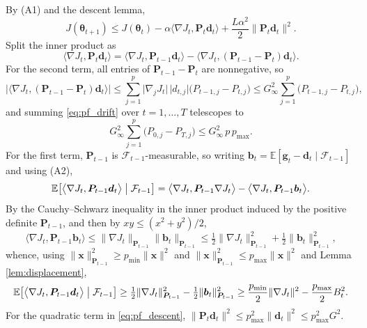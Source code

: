 \documentclass[a4paper,fleqn]{cas-sc}
\theoremstyle{plain}
\theoremstyle{definition}
\theoremstyle{remark}
\newcommand{\E}{\mathbb{E}}
\begin{document}
\begin{appendices}
By (A1) and the descent lemma,
\begin{equation}
\label{eq:pf_descent}
J(\bm\theta_{t+1})\le J(\bm\theta_t)-\alpha\bigl\langle\nabla J_t,\bm P_t\bm d_t\bigr\rangle+\frac{L\alpha^2}{2}\bigl\|\bm P_t\bm d_t\bigr\|^2 .
\end{equation}
Split the inner product as
\begin{equation}
\bigl\langle\nabla J_t,\bm P_t\bm d_t\bigr\rangle
=
\bigl\langle\nabla J_t,\bm P_{t-1}\bm d_t\bigr\rangle
-\bigl\langle\nabla J_t,(\bm P_{t-1}-\bm P_t)\bm d_t\bigr\rangle .
\end{equation}
For the second term, all entries of $\bm P_{t-1}-\bm P_t$ are nonnegative, so
\begin{equation}
\label{eq:pf_drift}
\bigl|\bigl\langle\nabla J_t,(\bm P_{t-1}-\bm P_t)\bm d_t\bigr\rangle\bigr|
\le
\sum_{j=1}^{p}\bigl|\nabla_jJ_t\bigr|\,\bigl|d_{t,j}\bigr|\bigl(P_{t-1,j}-P_{t,j}\bigr)
\le
G_\infty^{2}\sum_{j=1}^{p}\bigl(P_{t-1,j}-P_{t,j}\bigr),
\end{equation}
and summing \eqref{eq:pf_drift} over $t=1,\dots,T$ telescopes to
\begin{equation}
\label{eq:pf_telescope}
G_\infty^{2}\sum_{j=1}^{p}\bigl(P_{0,j}-P_{T,j}\bigr)\le G_\infty^{2}\,p\,p_{\max}.
\end{equation}
For the first term, $\bm P_{t-1}$ is $\mathcal F_{t-1}$-measurable, so writing $\bm b_t=\E[\bm g_t-\bm d_t\mid\mathcal F_{t-1}]$ and using (A2),
\begin{equation}
\E\bigl[\bigl\langle\nabla J_t,\bm P_{t-1}\bm d_t\bigr\rangle\bigm|\mathcal F_{t-1}\bigr]
=
\bigl\langle\nabla J_t,\bm P_{t-1}\nabla J_t\bigr\rangle-\bigl\langle\nabla J_t,\bm P_{t-1}\bm b_t\bigr\rangle .
\end{equation}
By the Cauchy--Schwarz inequality in the inner product induced by the positive definite $\bm P_{t-1}$, and then by $xy\le(x^2+y^2)/2$,
\begin{equation}
\bigl\langle\nabla J_t,\bm P_{t-1}\bm b_t\bigr\rangle
\le
\|\nabla J_t\|_{\bm P_{t-1}}\|\bm b_t\|_{\bm P_{t-1}}
\le
\tfrac12\|\nabla J_t\|^2_{\bm P_{t-1}}+\tfrac12\|\bm b_t\|^2_{\bm P_{t-1}} ,
\end{equation}
whence, using $\|\bm x\|^2_{\bm P_{t-1}}\ge p_{\min}\|\bm x\|^2$ and $\|\bm x\|^2_{\bm P_{t-1}}\le p_{\max}\|\bm x\|^2$ and Lemma \ref{lem:displacement},
\begin{equation}
\label{eq:pf_lower}
\E\bigl[\bigl\langle\nabla J_t,\bm P_{t-1}\bm d_t\bigr\rangle\bigm|\mathcal F_{t-1}\bigr]
\ge
\tfrac12\|\nabla J_t\|^2_{\bm P_{t-1}}-\tfrac12\|\bm b_t\|^2_{\bm P_{t-1}}
\ge
\frac{p_{\min}}2\|\nabla J_t\|^{2}-\frac{p_{\max}}2B^2_t .
\end{equation}
For the quadratic term in \eqref{eq:pf_descent}, $\|\bm P_t\bm d_t\|^2\le p^2_{\max}\|\bm d_t\|^2\le p^2_{\max}G^2$.


\end{appendices}
\end{document}
